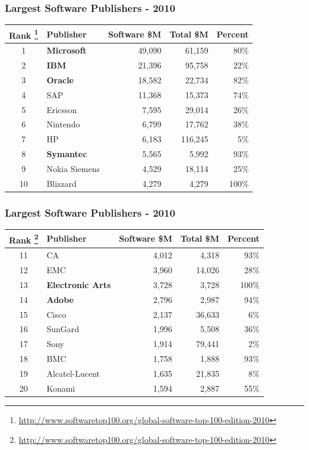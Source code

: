 \documentclass[18pt]{beamer}
\begin{document}
{
\begin{frame}
\frametitle{Largest Software Publishers - 2010}

\begin{center}
\begin{tabular}{clrrr}
\hline
  \textbf{Rank
\footnote{
\url{http://www.softwaretop100.org/global-software-top-100-edition-2010}}
} &\textbf{Publisher} &	\textbf{Software \$M} & \textbf{Total \$M} & \textbf{Percent} \\
\hline
\hline
1 &  \textbf{Microsoft} & 49,090  & 61,159 &  80\% \\
2 &  \textbf{IBM} & 21,396  & 95,758  & 22\% \\
3 &  \textbf{Oracle} & 18,582  & 22,734 &  82\% \\
4 &  SAP & 11,368  & 15,373 &  74\% \\
5 &  Ericsson & 7,595  & 29,014 &  26\% \\
6 &  Nintendo & 6,799  &  17,762 &  38\% \\
7 &  HP & 6,183  &  116,245 &  5\% \\
8 &  \textbf{Symantec} & 5,565  & 5,992 &  93\% \\
9 &  Nokia Siemens & 4,529  &  18,114 &  25\% \\
10&  Blizzard & 4,279  & 4,279 & 100\% \\
\end{tabular}

\end{center}
\end{frame}
}


{
\begin{frame}
\frametitle{Largest Software Publishers - 2010}

\begin{center}
\begin{tabular}{clrrr}
\hline
\textbf{Rank
\footnote{
\url{http://www.softwaretop100.org/global-software-top-100-edition-2010}}
} &\textbf{Publisher} &	\textbf{Software \$M} & \textbf{Total \$M} & \textbf{Percent} \\
\hline
\hline
11 & CA & 4,012  & 4,318 & 93\% \\
12 & EMC & 3,960  & 14,026 & 28\% \\
13 & \textbf{Electronic Arts} & 3,728  &  3,728 & 100\% \\
14 & \textbf{Adobe} & 2,796 &  2,987 & 94\% \\
15 & Cisco & 2,137 & 36,633 & 6\% \\
16 & SunGard & 1,996  & 5,508 & 36\% \\
17 & Sony & 1,914 &  79,441 & 2\% \\
18 & BMC & 1,758& 1,888 & 93\% \\
19 & Alcatel-Lucent & 1,635  &  21,835 & 8\% \\
20 & Konami & 1,594 &  2,887 & 55\% \\
\end{tabular}

\end{center}
\end{frame}
}
\end{document}
